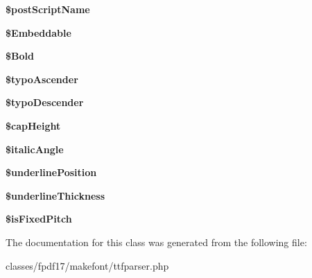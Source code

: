 \begin{DoxyCompactItemize}
\item 
\hypertarget{classTTFParser_ac67943b8655cae5c6ba81e7217abc04f}{{\bfseries \$post\+Script\+Name}}\label{classTTFParser_ac67943b8655cae5c6ba81e7217abc04f}

\item 
\hypertarget{classTTFParser_a511b00b1e6ca4011fe26e6d77ff542ea}{{\bfseries \$\+Embeddable}}\label{classTTFParser_a511b00b1e6ca4011fe26e6d77ff542ea}

\item 
\hypertarget{classTTFParser_a06cdff8e5c477c1953b59f9136ebe18f}{{\bfseries \$\+Bold}}\label{classTTFParser_a06cdff8e5c477c1953b59f9136ebe18f}

\item 
\hypertarget{classTTFParser_a2e6d7caa84b7c678d3c475f71ec81528}{{\bfseries \$typo\+Ascender}}\label{classTTFParser_a2e6d7caa84b7c678d3c475f71ec81528}

\item 
\hypertarget{classTTFParser_a7f2b6f4e0e71e6284255c46beb24586d}{{\bfseries \$typo\+Descender}}\label{classTTFParser_a7f2b6f4e0e71e6284255c46beb24586d}

\item 
\hypertarget{classTTFParser_af01d90cd33a90e906db3bcbd63d78a54}{{\bfseries \$cap\+Height}}\label{classTTFParser_af01d90cd33a90e906db3bcbd63d78a54}

\item 
\hypertarget{classTTFParser_a00bf745d03b39f24fb36f94f14083d62}{{\bfseries \$italic\+Angle}}\label{classTTFParser_a00bf745d03b39f24fb36f94f14083d62}

\item 
\hypertarget{classTTFParser_aa5db12337eeb53a2a0e33071dbe69e98}{{\bfseries \$underline\+Position}}\label{classTTFParser_aa5db12337eeb53a2a0e33071dbe69e98}

\item 
\hypertarget{classTTFParser_a676721af52dd3748c9e0fdbd3056883d}{{\bfseries \$underline\+Thickness}}\label{classTTFParser_a676721af52dd3748c9e0fdbd3056883d}

\item 
\hypertarget{classTTFParser_a939aa940d419002839e55f20ffd34b0a}{{\bfseries \$is\+Fixed\+Pitch}}\label{classTTFParser_a939aa940d419002839e55f20ffd34b0a}

\end{DoxyCompactItemize}


The documentation for this class was generated from the following file\+:\begin{DoxyCompactItemize}
\item 
classes/fpdf17/makefont/ttfparser.\+php\end{DoxyCompactItemize}

